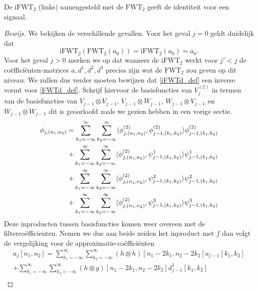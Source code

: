 \begin{stelling}
  De $\mathrm{iFWT}_2$ (links) samengesteld met de $\mathrm{FWT}_2$ geeft de identiteit voor een signaal.
\end{stelling}
\begin{proof}[Bewijs]
  We bekijken de verschillende gevallen. Voor het geval $j=0$ geldt duidelijk dat
  \[
  \mathrm{iFWT}_2(\mathrm{FWT}_2(a_0)) = \mathrm{iFWT}_2(a_0) = a_0.
  \]
  Voor het geval $j>0$ merken we op dat wanneer de $\mathrm{iFWT}_2$ werkt voor $j'<j$ de co\"effici\"enten-matrices
  $a,d^1,d^2,d^3$ precies zijn wat de $\mathrm{FWT}_2$ zou geven op dit niveau. 
  We zullen dus verder moeten bewijzen dat \ref{iFWTd_def} een inverse vormt voor
  \ref{FWTd_def}.
  Schrijf hiervoor de basisfuncties van $V^{(2)}_j$ in termen van de basisfuncties van 
  $V_{j-1}\otimes V_{j-1}$, $V_{j-1}\otimes W_{j-1}$, $W_{j-1}\otimes V_{j-1}$ en $W_{j-1}\otimes W_{j-1}$
  dit is geoorloofd zoals we gezien hebben in een vorige sectie.
  \begin{equation*}
    \begin{split}
      \phi_{j,(n_1,n_2)} = 
      \sum_{k_1=-\infty}^\infty\sum_{k_2=-\infty}^\infty 
      \langle \phi^{(2)}_{j,(n_1,n_2)} , \phi^{(2)}_{j-1,(k_1,k_2)} \rangle \phi^{(2)}_{j-1,(k_1,k_2)} \\
      + \sum_{k_1=-\infty}^\infty\sum_{k_2=-\infty}^\infty 
      \langle \phi^{(2)}_{j,(n_1,n_2)} , \psi^1_{j-1,(k_1,k_2)} \rangle \psi^1_{j-1,(k_1,k_2)} \\
      + \sum_{k_1=-\infty}^\infty\sum_{k_2=-\infty}^\infty 
      \langle \phi^{(2)}_{j,(n_1,n_2)} , \psi^2_{j-1,(k_1,k_2)} \rangle \psi^2_{j-1,(k_1,k_2)} \\
      + \sum_{k_1=-\infty}^\infty\sum_{k_2=-\infty}^\infty 
      \langle \phi^{(2)}_{j,(n_1,n_2)} , \psi^3_{j-1,(k_1,k_2)} \rangle \psi^3_{j-1,(k_1,k_2)}
      \end{split}
  \end{equation*}
  Deze inproducten tussen basisfuncties komen weer overeen met de filterco\"efficienten. Nemen we dus aan
  beide zeiden het inproduct met $f$ dan volgt de vergelijking voor de approximatie-co\"effici\"enten
  \begin{equation*}
    \begin{split}
      a_{j}[n_1,n_2] = 
      \sum_{k_1=-\infty}^\infty\sum_{k_2=-\infty}^\infty 
      (h\otimes h)[n_1-2k_1,n_2-2k_2] a_{j-1}[k_1,k_2] \\
      + \sum_{k_1=-\infty}^\infty\sum_{k_2=-\infty}^\infty 
      (h\otimes g)[n_1-2k_1,n_2-2k_2] d^1_{j-1}[k_1,k_2] \\

\end{split}
\end{equation*}
\end{proof}
